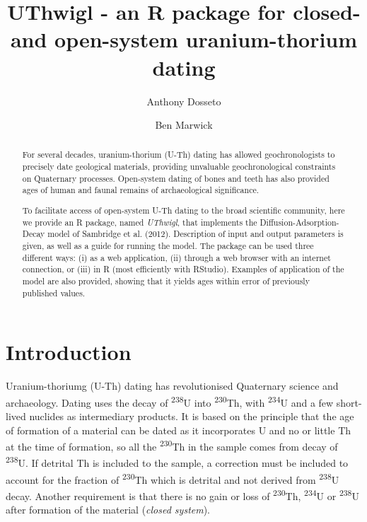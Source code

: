 \documentclass[]{elsarticle} %
\begin{document}
\begin{frontmatter}

  \title{UThwigl - an R package for closed- and open-system uranium-thorium dating}
    \author[University of Wollongong]{Anthony Dosseto}
    \author[University of Washington]{Ben Marwick}
  
      \address[University of Wollongong]{Wollongong Isotope Geochronology Laboratory, School of Earth, Atmosphere \& Life Sciences, University of Wollongong, Wollongong NSW Australia}
    \address[University of Washington]{Department of Anthropology, University of Washington, Seattle, WA, USA}
  
  \begin{abstract}
  For several decades, uranium-thorium (U-Th) dating has allowed geochronologists to precisely date geological materials, providing unvaluable geochronological constraints on Quaternary processes. Open-system dating of bones and teeth has also provided ages of human and faunal remains of archaeological significance.
  
  To facilitate access of open-system U-Th dating to the broad scientific community, here we provide an R package, named \emph{UThwigl}, that implements the Diffusion-Adsorption-Decay model of Sambridge et al. (2012). Description of input and output parameters is given, as well as a guide for running the model. The package can be used three different ways: (i) as a web application, (ii) through a web browser with an internet connection, or (iii) in R (most efficiently with RStudio). Examples of application of the model are also provided, showing that it yields ages within error of previously published values.\\
  \end{abstract}
  
 \end{frontmatter}

\newpage
\linenumbers

\hypertarget{introduction}{%
\section{Introduction}\label{introduction}}

Uranium-thoriumg (U-Th) dating has revolutionised Quaternary science and archaeology. Dating uses the decay of \textsuperscript{238}U into \textsuperscript{230}Th, with \textsuperscript{234}U and a few short-lived nuclides as intermediary products. It is based on the principle that the age of formation of a material can be dated as it incorporates U and no or little Th at the time of formation, so all the \textsuperscript{230}Th in the sample comes from decay of \textsuperscript{238}U. If detrital Th is included to the sample, a correction must be included to account for the fraction of \textsuperscript{230}Th which is detrital and not derived from \textsuperscript{238}U decay. Another requirement is that there is no gain or loss of \textsuperscript{230}Th, \textsuperscript{234}U or \textsuperscript{238}U after formation of the material (\emph{closed system}).
\end{document}
